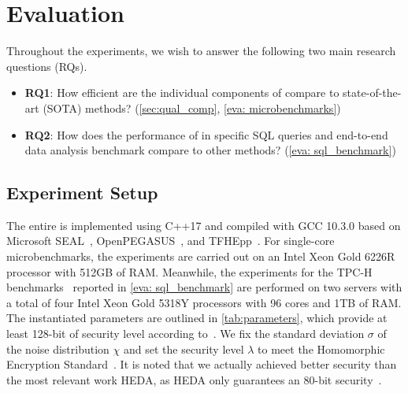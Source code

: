 \section{Evaluation}\label{eva}
Throughout the experiments,
we wish to answer the following two main research questions (RQs).
\begin{itemize}
    \item {\bf{RQ1}}: How efficient are the individual components of \NAME
    compare to state-of-the-art (SOTA) methods? (\cref{sec:qual_comp}, \cref{eva: microbenchmarks}) 
    \item {\bf{RQ2}}: How does the performance of \NAME in specific SQL queries 
    and end-to-end data analysis benchmark compare to other methods? 
    (\cref{eva: sql_benchmark})
\end{itemize}

\subsection{Experiment Setup}\label{eva:Arch}
The entire \NAME is implemented using C++17 and 
compiled with GCC 10.3.0 based on Microsoft SEAL~\cite{codeseal},
OpenPEGASUS~\cite{codepegasus}, and TFHEpp~\cite{codetfhepp}.
For single-core microbenchmarks, the experiments are  carried out on 
an Intel Xeon Gold 6226R processor with 512GB of RAM. Meanwhile,
the experiments for the TPC-H benchmarks~\cite{tpc_h} reported in \cref{eva: sql_benchmark} are performed
on two servers with a total of four Intel Xeon Gold 5318Y processors with
96 cores and 1TB of RAM.
The instantiated parameters are outlined in \cref{tab:parameters}, which provide 
at least 128-bit of security level according to~\cite{lweestimator}.
We fix the standard deviation 
$\sigma$ of the 
noise distribution $\chi$ and set the security level $\lambda$ 
to meet the Homomorphic Encryption Standard~\cite{HomomorphicEncryptionSecurityStandard}. 
It is noted that we actually achieved better security than the most relevant work HEDA,
as HEDA only guarantees an 80-bit security~\cite{heda}.










